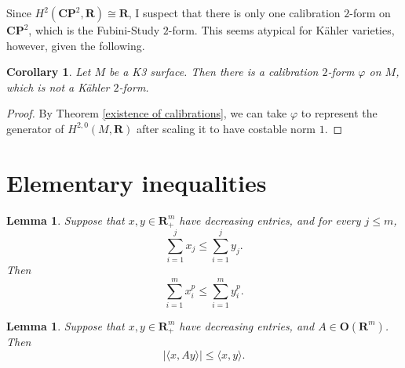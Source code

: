 \documentclass[reqno,11pt]{amsart}
\newcommand{\RR}{\mathbf{R}}
\newcommand{\CC}{\mathbf{C}}
\newcommand{\PP}{\mathbf P}
\newcommand{\Orth}{\mathbf{O}}
\newtheorem{lemma}[theorem]{Lemma}
\newtheorem{corollary}[theorem]{Corollary}
\theoremstyle{definition}
\numberwithin{equation}{section}
\begin{document}
Since $H^2(\CC \PP^2, \RR) \cong \RR$, I suspect that there is only one calibration $2$-form on $\CC \PP^2$, which is the Fubini-Study $2$-form.
This seems atypical for K\"ahler varieties, however, given the following.

\begin{corollary}
Let $M$ be a K3 surface. Then there is a calibration $2$-form $\varphi$ on $M$, which is not a K\"ahler $2$-form.
\end{corollary}
\begin{proof}
By Theorem \ref{existence of calibrations}, we can take $\varphi$ to represent the generator of $H^{2, 0}(M, \RR)$ after scaling it to have costable norm $1$.
\end{proof}


\appendix 
\section{Elementary inequalities}
\begin{lemma}
Suppose that $x, y \in \RR^m_+$ have decreasing entries, and for every $j \leq m$,
\begin{equation}\label{Ky Fan gives SvN hyp}
\sum_{i=1}^j x_j \leq \sum_{i=1}^j y_j.
\end{equation}
Then 
\begin{equation}\label{Ky Fan gives SvN concl}
\sum_{i=1}^m x_i^p \leq \sum_{i=1}^m y_i^p.
\end{equation}
\end{lemma}

\begin{lemma}
Suppose that $x, y \in \RR^m_+$ have decreasing entries, and $A \in \Orth(\RR^m)$. Then
\begin{equation}\label{permute to decreasing}
|\langle x, Ay\rangle| \leq \langle x, y\rangle.
\end{equation}
\end{lemma}

\printbibliography
\end{document}
